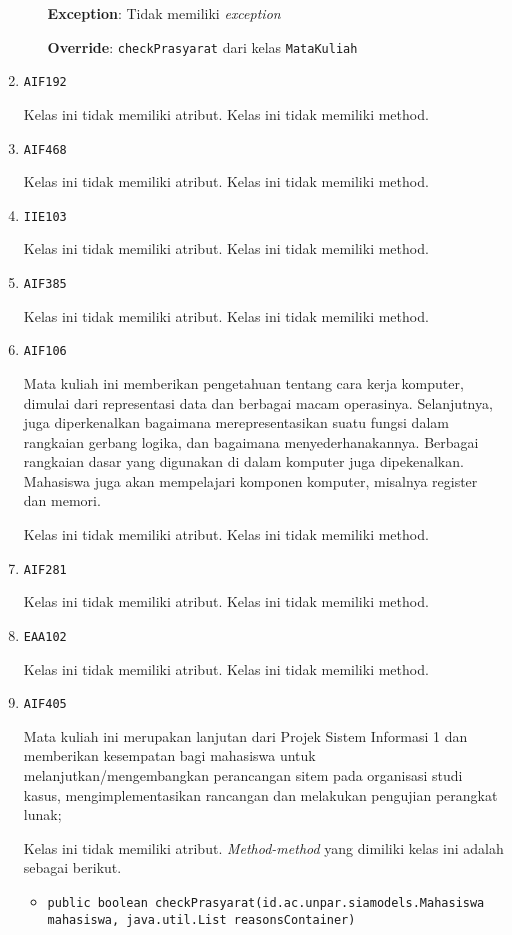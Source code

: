 \documentclass{article}
\begin{document}
\begin{enumerate}
\begin{itemize}
\textbf{Exception}: Tidak memiliki \textit{exception}

\textbf{Override}: \texttt{checkPrasyarat} dari kelas \texttt{MataKuliah}

\end{itemize}
\item \texttt{AIF192}



Kelas ini tidak memiliki atribut. Kelas ini tidak memiliki method. \item \texttt{AIF468}



Kelas ini tidak memiliki atribut. Kelas ini tidak memiliki method. \item \texttt{IIE103}



Kelas ini tidak memiliki atribut. Kelas ini tidak memiliki method. \item \texttt{AIF385}



Kelas ini tidak memiliki atribut. Kelas ini tidak memiliki method. \item \texttt{AIF106}

Mata kuliah ini memberikan pengetahuan tentang cara kerja komputer, dimulai 
 dari representasi data dan berbagai macam operasinya. Selanjutnya, juga 
 diperkenalkan bagaimana merepresentasikan suatu fungsi dalam rangkaian 
 gerbang logika, dan bagaimana menyederhanakannya. Berbagai rangkaian dasar 
 yang digunakan di dalam komputer juga dipekenalkan. Mahasiswa juga akan 
 mempelajari komponen komputer, misalnya register dan memori.

Kelas ini tidak memiliki atribut. Kelas ini tidak memiliki method. \item \texttt{AIF281}



Kelas ini tidak memiliki atribut. Kelas ini tidak memiliki method. \item \texttt{EAA102}



Kelas ini tidak memiliki atribut. Kelas ini tidak memiliki method. \item \texttt{AIF405}

Mata kuliah ini merupakan lanjutan dari Projek Sistem Informasi 1 dan
 memberikan kesempatan bagi mahasiswa untuk melanjutkan/mengembangkan
 perancangan sitem pada organisasi studi kasus, mengimplementasikan rancangan
 dan melakukan pengujian perangkat lunak;

Kelas ini tidak memiliki atribut. \textit{Method-method} yang dimiliki kelas ini adalah sebagai berikut.
\begin{itemize}
\item \texttt{public boolean checkPrasyarat(id.ac.unpar.siamodels.Mahasiswa mahasiswa, java.util.List reasonsContainer)}


\end{itemize}
\end{enumerate}
\end{document}
